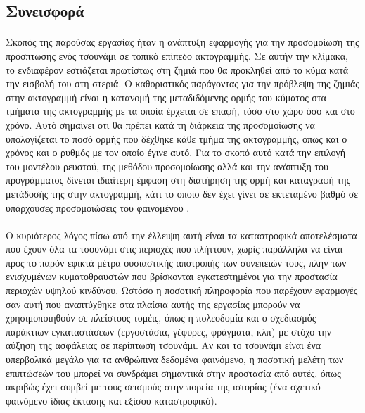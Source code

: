 \subsection{Συνεισφορά}
\paragraph{} Σκοπός της παρούσας εργασίας ήταν η ανάπτυξη εφαρμογής για την προσομοίωση
της πρόσπτωσης ενός τσουνάμι σε τοπικό επίπεδο ακτογραμμής. Σε αυτήν την κλίμακα, το
ενδιαφέρον εστιάζεται πρωτίστως στη ζημιά που θα προκληθεί από το κύμα κατά την εισβολή
του στη στεριά. Ο καθοριστικός παράγοντας για την πρόβλεψη της ζημιάς στην ακτογραμμή
είναι η κατανομή της μεταδιδόμενης ορμής του κύματος στα τμήματα της ακτογραμμής με τα
οποία έρχεται σε επαφή, τόσο στο χώρο όσο και στο χρόνο. Αυτό σημαίνει οτι θα πρέπει κατά
τη διάρκεια της προσομοίωσης να υπολογίζεται το ποσό ορμής που δέχθηκε κάθε τμήμα της
ακτογραμμής, όπως και ο χρόνος και ο ρυθμός με τον οποίο έγινε αυτό. Για το σκοπό αυτό
κατά την επιλογή του μοντέλου ρευστού, της μεθόδου προσομοίωσης αλλά και την ανάπτυξη του
προγράμματος δίνεται ιδιαίτερη έμφαση στη διατήρηση της ορμή και καταγραφή της μετάδοσής
της στην ακτογραμμή, κάτι το οποίο δεν έχει γίνει σε εκτεταμένο βαθμό σε υπάρχουσες
προσομοιώσεις του φαινομένου \cite{debroux2001three}.

\paragraph{} Ο κυριότερος λόγος πίσω από την έλλειψη αυτή είναι τα καταστροφικά
αποτελέσματα που έχουν όλα τα τσουνάμι στις περιοχές που πλήττουν, χωρίς παράλληλα να
είναι προς το παρόν εφικτά μέτρα ουσιαστικής αποτροπής των συνεπειών τους, πλην των
ενισχυμένων κυματοθραυστών που βρίσκονται εγκατεστημένοι για την προστασία περιοχών υψηλού
κινδύνου. Ωστόσο η ποσοτική πληροφορία που παρέχουν εφαρμογές σαν αυτή που αναπτύχθηκε στα
πλαίσια αυτής της εργασίας μπορούν να χρησιμοποιηθούν σε πλείστους τομέις, όπως η
πολεοδομία και ο σχεδιασμός παράκτιων εγκαταστάσεων (εργοστάσια, γέφυρες, φράγματα, κλπ)
με στόχο την αύξηση της ασφάλειας σε περίπτωση τσουνάμι. Αν και το τσουνάμι είναι ένα
υπερβολικά μεγάλο για τα ανθρώπινα δεδομένα φαινόμενο, η ποσοτική μελέτη των επιπτώσεών
του μπορεί να συνδράμει σημαντικά στην προστασία από αυτές, όπως ακριβώς έχει συμβεί με
τους σεισμούς στην πορεία της ιστορίας (ένα σχετικό φαινόμενο ίδιας έκτασης και εξίσου
καταστροφικό).


